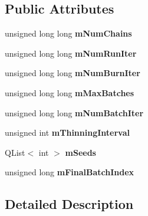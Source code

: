 \subsection*{Public Attributes}
\begin{DoxyCompactItemize}
\item 
\hypertarget{class_m_c_m_c_settings_af93abc869d7d5180a092e60ed7cf3fb2}{unsigned long long {\bfseries m\-Num\-Chains}}\label{class_m_c_m_c_settings_af93abc869d7d5180a092e60ed7cf3fb2}

\item 
\hypertarget{class_m_c_m_c_settings_a33dfbcab7369d431aff54c43f8cdedbf}{unsigned long long {\bfseries m\-Num\-Run\-Iter}}\label{class_m_c_m_c_settings_a33dfbcab7369d431aff54c43f8cdedbf}

\item 
\hypertarget{class_m_c_m_c_settings_acf1a593727144b4b66d66f4a7619b0fd}{unsigned long long {\bfseries m\-Num\-Burn\-Iter}}\label{class_m_c_m_c_settings_acf1a593727144b4b66d66f4a7619b0fd}

\item 
\hypertarget{class_m_c_m_c_settings_aea0a79544fe5394c3eae33c274112ae6}{unsigned long long {\bfseries m\-Max\-Batches}}\label{class_m_c_m_c_settings_aea0a79544fe5394c3eae33c274112ae6}

\item 
\hypertarget{class_m_c_m_c_settings_a5257322a4ad1965bdd6cf5261d7c8ac0}{unsigned long long {\bfseries m\-Num\-Batch\-Iter}}\label{class_m_c_m_c_settings_a5257322a4ad1965bdd6cf5261d7c8ac0}

\item 
\hypertarget{class_m_c_m_c_settings_a4323fd0702eb2ac05eba0da1ef0a561d}{unsigned int {\bfseries m\-Thinning\-Interval}}\label{class_m_c_m_c_settings_a4323fd0702eb2ac05eba0da1ef0a561d}

\item 
\hypertarget{class_m_c_m_c_settings_acaccd9929e375b94a65fe992ed07f0a2}{Q\-List$<$ int $>$ {\bfseries m\-Seeds}}\label{class_m_c_m_c_settings_acaccd9929e375b94a65fe992ed07f0a2}

\item 
\hypertarget{class_m_c_m_c_settings_a86e0efe9a5e84f3106f7829a60c5d47c}{unsigned long {\bfseries m\-Final\-Batch\-Index}}\label{class_m_c_m_c_settings_a86e0efe9a5e84f3106f7829a60c5d47c}

\end{DoxyCompactItemize}


\subsection{Detailed Description}


